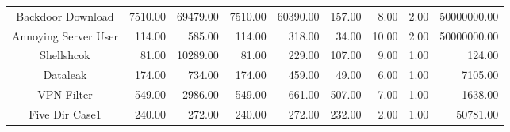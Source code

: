 \begin{table*}[!htb]
{\begin{tabular}{crrrrrrrr}
Backdoor Download    & 7510.00                                              & 69479.00                                             & 7510.00                                     & 60390.00                                     & 157.00                                   & 8.00                                       & 2.00                                        & 50000000.00                      \\
Annoying Server User & 114.00                                               & 585.00                                               & 114.00                                      & 318.00                                       & 34.00                                    & 10.00                                      & 2.00                                        & 50000000.00                      \\
Shellshcok           & 81.00                                                & 10289.00                                             & 81.00                                       & 229.00                                       & 107.00                                   & 9.00                                       & 1.00                                        & 124.00                           \\
Dataleak             & 174.00                                               & 734.00                                               & 174.00                                      & 459.00                                       & 49.00                                    & 6.00                                       & 1.00                                        & 7105.00                          \\
VPN Filter           & 549.00                                               & 2986.00                                              & 549.00                                      & 661.00                                       & 507.00                                   & 7.00                                       & 1.00                                        & 1638.00                          \\
Five Dir Case1       & 240.00                                               & 272.00                                               & 240.00                                      & 272.00                                       & 232.00                                   & 2.00                                       & 1.00                                        & 50781.00                         \\

\end{tabular}}
\end{table*}
